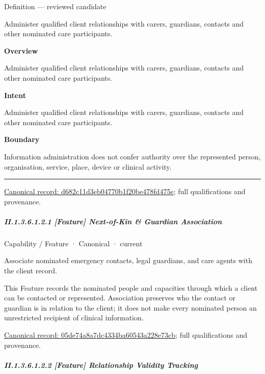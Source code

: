 Definition — reviewed candidate



Administer qualified client relationships with carers, guardians, contacts and other nominated care participants.



\textbf{Overview}



Administer qualified client relationships with carers, guardians, contacts and other nominated care participants.



\textbf{Intent}



Administer qualified client relationships with carers, guardians, contacts and other nominated care participants.



\textbf{Boundary}



Information administration does not confer authority over the represented person, organisation, service, place, device or clinical activity.



\medskip\hrule\medskip

{\footnotesize \href{../../../../continuum/strategy/capability/d682c11d3eb04770b1f20be478fd475e.md}{Canonical record: d682c11d3eb04770b1f20be478fd475e}; full qualifications and provenance.}\par
\subparagraph*{II.1.3.6.1.2.1 [Feature] Next-of-Kin \& Guardian Association}
\label{navigation:II.1.3.6.1.2.1}

\label{element:05de74a8a7dc4334ba60543a228e73cb}
{\small Capability / Feature · Canonical · current}\par

Associate nominated emergency contacts, legal guardians, and care agents with the client record.



This Feature records the nominated people and capacities through which a client can be contacted or represented. Association preserves who the contact or guardian is in relation to the client; it does not make every nominated person an unrestricted recipient of clinical information.


{\footnotesize \href{../../../../continuum/strategy/capability/feature/05de74a8a7dc4334ba60543a228e73cb.md}{Canonical record: 05de74a8a7dc4334ba60543a228e73cb}; full qualifications and provenance.}\par
\subparagraph*{II.1.3.6.1.2.2 [Feature] Relationship Validity Tracking}
\label{navigation:II.1.3.6.1.2.2}


